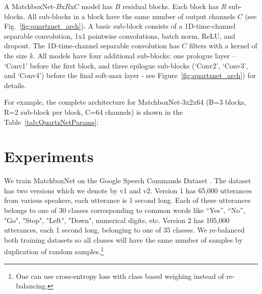 \documentclass[a4paper]{article}
\begin{document}
A MatchboxNet-$B$x$R$x$C$ model has $B$ residual blocks. Each block has $R$ sub-blocks. All sub-blocks in a block have the same number of output channels $C$ (see Fig.~\ref{fig:quartznet_arch}).
A basic sub-block consists of a 1D-time-channel separable convolution, 1x1 pointwise convolutions, batch norm, ReLU, and dropout. The 1D-time-channel separable convolution has $C$ filters with a kernel of the size $k$.
All models have four additional sub-blocks: one prologue layer -- `Conv1' before the first block, and three epilogue sub-blocks  (`Conv2', `Conv3', and `Conv4') before the final soft-max layer - see Figure~\ref{fig:quartznet_arch}) for details.

For example, the complete architecture for MatchboxNet-3x2x64 (B=3 blocks, R=2 sub-block per block, C=64 channels) is shown in the Table~\ref{tab:QuartzNetParams}:

{\renewcommand{\arraystretch}{1.1}
\begin{table}[!h]
\caption{MatchboxNet-3x2x64 model has B=3 blocks, each black has R=2 time-channel separable convolutional sub-blocks with C=64 channels, plus 4 additional sub-blocks: prologue - Conv1, and epilogue -  Conv2, Conv3, Conv4).}
\label{tab:QuartzNetParams}
\centering
{}
\end{table}
}

\section{Experiments}
We train MatchboxNet on the Google Speech Commands Dataset \cite{warden2018speech}. The dataset has two versions which we denote by v1 and v2. Version 1 has 65,000 utterances from various speakers, each utterance is 1 second long. Each of these utterances belongs to one of 30 classes corresponding to common words like “Yes”, “No”, "Go", "Stop", "Left", "Down", numerical digits, etc. 
Version 2 has 105,000 utterances, each 1 second long, belonging to one of 35 classes. 
We re-balanced both training datasets so all classes will have the same number of samples by duplication of random samples.\footnote{One can use cross-entropy loss with class based weighing instead of re-balancing.}
\end{document}
